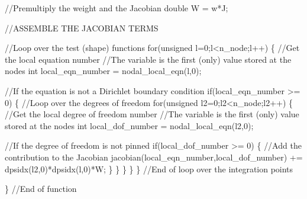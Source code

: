 \begin{DoxyCodeInclude}
      \textcolor{comment}{//Premultiply the weight and the Jacobian}
      \textcolor{keywordtype}{double} W = w*J;
            
      \textcolor{comment}{//ASSEMBLE THE JACOBIAN TERMS}
      
      \textcolor{comment}{//Loop over the test (shape) functions}
      \textcolor{keywordflow}{for}(\textcolor{keywordtype}{unsigned} l=0;l<n\_node;l++)
       \{
        \textcolor{comment}{//Get the local equation number}
        \textcolor{comment}{//The variable is the first (only) value stored at the nodes}
        \textcolor{keywordtype}{int} local\_eqn\_number = nodal\_local\_eqn(l,0);

        \textcolor{comment}{//If the equation is not a Dirichlet boundary condition}
        \textcolor{keywordflow}{if}(local\_eqn\_number >= 0)
         \{
          \textcolor{comment}{//Loop over the degrees of freedom}
          \textcolor{keywordflow}{for}(\textcolor{keywordtype}{unsigned} l2=0;l2<n\_node;l2++)
           \{
            \textcolor{comment}{//Get the local degree of freedom number}
            \textcolor{comment}{//The variable is the first (only) value stored at the nodes}
            \textcolor{keywordtype}{int} local\_dof\_number = nodal\_local\_eqn(l2,0);

            \textcolor{comment}{//If the degree of freedom is not pinned}
            \textcolor{keywordflow}{if}(local\_dof\_number >= 0)
             \{
              \textcolor{comment}{//Add the contribution to the Jacobian}
              jacobian(local\_eqn\_number,local\_dof\_number) += 
               dpsidx(l2,0)*dpsidx(l,0)*W;
             \}
           \}
         \}
       \}
     \} \textcolor{comment}{//End of loop over the integration points}

   \} \textcolor{comment}{//End of function}

\end{DoxyCodeInclude}


